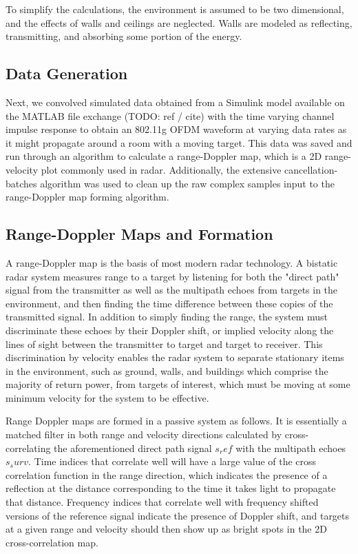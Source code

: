 \documentclass[article,11pt,onecolumn,final]{IEEEtran}
\begin{document}
To simplify the calculations, the environment is assumed to be two dimensional, and the effects of walls and ceilings are neglected. Walls are modeled as reflecting, transmitting, and absorbing some portion of the energy.

\subsection{Data Generation}
Next, we convolved simulated data obtained from a Simulink model available on the MATLAB file exchange (TODO: ref / cite) with the time varying channel impulse response to obtain an 802.11g OFDM waveform at varying data rates as it might propagate around a room with a moving target. This data was saved and run through an algorithm to calculate a range-Doppler map, which is a 2D range-velocity plot commonly used in radar. Additionally, the extensive cancellation-batches algorithm was used to clean up the raw complex samples input to the range-Doppler map forming algorithm.

\subsection{Range-Doppler Maps and Formation}

A range-Doppler map is the basis of most modern radar technology. A bistatic radar system measures range to a target by listening for both the "direct path" signal from the transmitter as well as the multipath echoes from targets in the environment, and then finding the time difference between these copies of the transmitted signal. In addition to simply finding the range, the system must discriminate these echoes by their Doppler shift, or implied velocity along the lines of sight between the transmitter to target and target to receiver. This discrimination by velocity enables the radar system to separate stationary items in the environment, such as ground, walls, and buildings which comprise the majority of return power, from targets of interest, which must be moving at some minimum velocity for the system to be effective.

Range Doppler maps are formed in a passive system as follows. It is essentially a matched filter in both range and velocity directions calculated by cross-correlating the aforementioned direct path signal $s_ref$ with the multipath echoes $s_surv$. Time indices that correlate well will have a large value of the cross correlation function in the range direction, which indicates the presence of a reflection at the distance corresponding to the time it takes light to propagate that distance. Frequency indices that correlate well with frequency shifted versions of the reference signal indicate the presence of Doppler shift, and targets at a given range and velocity should then show up as bright spots in the 2D cross-correlation map.
\end{document}
